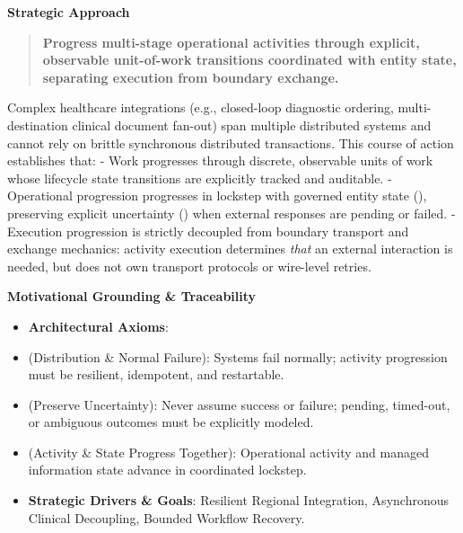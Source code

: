\par\medskip\textbf{Strategic Approach}\par


\begin{quote}


\textbf{Progress multi-stage operational activities through explicit, observable unit-of-work transitions coordinated with entity state, separating execution from boundary exchange.}



\end{quote}


Complex healthcare integrations (e.g., closed-loop diagnostic ordering, multi-destination clinical document fan-out) span multiple distributed systems and cannot rely on brittle synchronous distributed transactions. This course of action establishes that:
- Work progresses through discrete, observable units of work whose lifecycle state transitions are explicitly tracked and auditable.
- Operational progression progresses in lockstep with governed entity state (\texttt{}), preserving explicit uncertainty (\texttt{}) when external responses are pending or failed.
- Execution progression is strictly decoupled from boundary transport and exchange mechanics: activity execution determines \emph{that} an external interaction is needed, but does not own transport protocols or wire-level retries.



\par\medskip\textbf{Motivational Grounding \& Traceability}\par


\begin{itemize}


\item \textbf{Architectural Axioms}:

\item \texttt{} (Distribution \& Normal Failure): Systems fail normally; activity progression must be resilient, idempotent, and restartable.

\item \texttt{} (Preserve Uncertainty): Never assume success or failure; pending, timed-out, or ambiguous outcomes must be explicitly modeled.

\item \texttt{} (Activity \& State Progress Together): Operational activity and managed information state advance in coordinated lockstep.

\item \textbf{Strategic Drivers \& Goals}: Resilient Regional Integration, Asynchronous Clinical Decoupling, Bounded Workflow Recovery.

\end{itemize}


